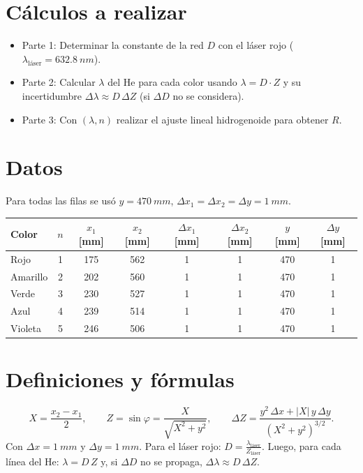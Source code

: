 \documentclass[11pt,a4paper]{article}
\author{}
\date{}
\begin{document}
\section*{Cálculos a realizar}
\begin{itemize}
  \item Parte 1: Determinar la constante de la red \(D\) con el láser rojo (\(\lambda_{\text{láser}}=\SI{632,8}{nm}\)).
  \item Parte 2: Calcular \(\lambda\) del He para cada color usando \( \lambda = D\cdot Z \) y su incertidumbre \( \Delta\lambda \approx D\,\Delta Z\) (si \(\Delta D\) no se considera).
  \item Parte 3: Con \((\lambda,n)\) realizar el ajuste lineal hidrogenoide para obtener \(R\).
\end{itemize}

\section*{Datos}
Para todas las filas se usó \(y=\SI{470}{mm}\), \(\Delta x_1=\Delta x_2=\Delta y=\SI{1}{mm}\).
\begin{center}
\begin{tabular}{@{}lccccccc@{}}
\toprule
Color & \(n\) & \(x_1\) [mm] & \(x_2\) [mm] & \(\Delta x_1\) [mm] & \(\Delta x_2\) [mm] & \(y\) [mm] & \(\Delta y\) [mm] \\
\midrule
Rojo     & 1 & 175 & 562 & 1 & 1 & 470 & 1 \\
Amarillo & 2 & 202 & 560 & 1 & 1 & 470 & 1 \\
Verde    & 3 & 230 & 527 & 1 & 1 & 470 & 1 \\
Azul     & 4 & 239 & 514 & 1 & 1 & 470 & 1 \\
Violeta  & 5 & 246 & 506 & 1 & 1 & 470 & 1 \\
\bottomrule
\end{tabular}
\end{center}

\section*{Definiciones y fórmulas}
\[
X=\frac{x_2-x_1}{2},\qquad
Z=\sin\varphi=\frac{X}{\sqrt{X^2+y^2}},\qquad
\Delta Z=\frac{y^2\,\Delta x + |X|\,y\,\Delta y}{(X^2+y^2)^{3/2}}.
\]
Con \(\Delta x=\SI{1}{mm}\) y \(\Delta y=\SI{1}{mm}\).
Para el láser rojo: \(\displaystyle D=\frac{\lambda_{\text{láser}}}{Z_{\text{láser}}}\).
Luego, para cada línea del He: \(\lambda=D\,Z\) y, si \(\Delta D\) no se propaga, \(\Delta\lambda \approx D\,\Delta Z\).
\end{document}
